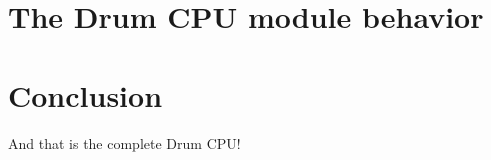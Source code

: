 
\section{The Drum CPU module behavior}


\section{Conclusion}

And that is the complete Drum CPU!


